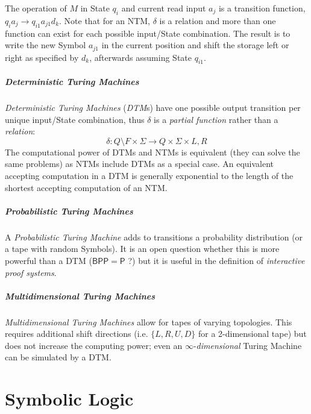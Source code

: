 \documentclass{article}
\begin{document}
The operation of $M$ in State $q_i$ and current read input $a_j$ is a
transition function, $q_i a_j \rightarrow q_{i1} a_{j1} d_k$. Note
that for an NTM, $\delta$ is a relation and more than one function can
exist for each possible input/State combination. The result is to
write the new Symbol $a_{j1}$ in the current position and shift the
storage left or right as specified by $d_k$, afterwards assuming State
$q_{i1}$.

\subsubsection{Deterministic Turing Machines}
\emph{Deterministic Turing Machines} (\emph{DTM}s) have one possible
output transition per unique input/State combination, thus $\delta$ is
a \emph{partial function} rather than a \emph{relation}:
\[
    \delta : Q \setminus F \times \Sigma \rightarrow Q \times
    \Sigma \times {L,R}
\]
The computational power of DTMs and NTMs is equivalent (they can solve
the same problems) as NTMs include DTMs as a special case. An
equivalent accepting computation in a DTM is generally exponential to
the length of the shortest accepting computation of an NTM.

\subsubsection{Probabilistic Turing Machines}
A \emph{Probabilistic Turing Machine} adds to transitions a
probability distribution (or a tape with random Symbols). It is an
open question whether this is more powerful than a DTM
($\mathsf{BPP}=\mathsf{P}$ ?)  but it is useful in the definition of
\emph{interactive proof systems}. %

\subsubsection{Multidimensional Turing Machines}
\emph{Multidimensional Turing Machines} allow for tapes of varying
topologies. This requires additional shift directions (i.e. $\{L, R, U,
D\}$ for a 2-dimensional tape) but does not increase the computing
power; even an $\infty$-\emph{dimensional} Turing Machine can be
simulated by a DTM.

\part{Symbolic Logic}\label{sec:formal_logic}
\end{document}
